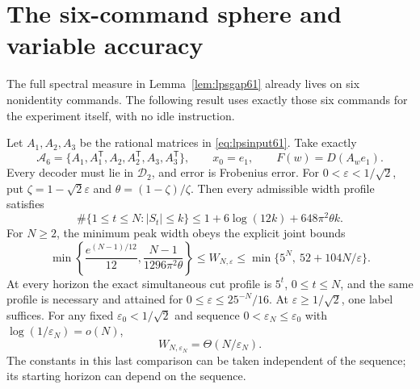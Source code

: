 \section{The six-command sphere and variable accuracy}\label{sec:noidle62}
The full spectral measure in Lemma~\ref{lem:lpsgap61} already lives on
six nonidentity commands. The following result uses exactly those six
commands for the experiment itself, with no idle instruction.

\begin{theorem}\label{thm:noidle62}
Let $A_1,A_2,A_3$ be the rational matrices in \eqref{eq:lpsinput61}.
Take exactly
\[
 \mathcal A_6=\{A_1,A_1^{\mathsf T},A_2,A_2^{\mathsf T},A_3,A_3^{\mathsf T}\},
 \qquad x_0=e_1,\qquad F(w)=D(A_we_1).
\]
Every decoder must lie in $\mathcal D_2$, and error is Frobenius error.
For $0<\varepsilon<1/\sqrt2$, put
$\zeta=1-\sqrt2\varepsilon$ and $\theta=(1-\zeta)/\zeta$.
Then every admissible width profile satisfies
\begin{equation}\label{eq:noidleoccupation62}
 \#\{1\le t\le N:|S_t|\le k\}
             \le1+6\log(12k)+648\pi^2\theta k.
\end{equation}
For $N\ge2$, the minimum peak width obeys the explicit joint bounds
\begin{equation}\label{eq:noidlejoint62}
 \min\left\{\frac{e^{(N-1)/12}}{12},
                   \frac{N-1}{1296\pi^2\theta}\right\}
 \le W_{N,\varepsilon}
 \le\min\{5^N,\ 52+104N/\varepsilon\}.
\end{equation}
At every horizon the exact simultaneous cut profile is $5^t$,
$0\le t\le N$, and the same profile is necessary and attained for
$0\le\varepsilon\le25^{-N}/16$. At
$\varepsilon\ge1/\sqrt2$, one label suffices.
For any fixed $\varepsilon_0<1/\sqrt2$ and sequence
$0<\varepsilon_N\le\varepsilon_0$ with
$\log(1/\varepsilon_N)=o(N)$,
\begin{equation}\label{eq:sixjointmatched62}
                  W_{N,\varepsilon_N}=\Theta(N/\varepsilon_N).
\end{equation}
The constants in this last comparison can be taken independent of the
sequence; its starting horizon can depend on the sequence.
\end{theorem}
